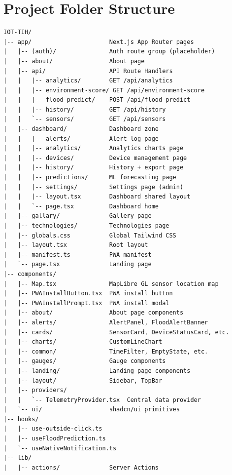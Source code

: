 ﻿%
\chapter{Project Folder Structure}
\label{app:structure}

\begin{lstlisting}[language={},caption={Top-level project folder structure}]
IOT-TIH/
|-- app/                      Next.js App Router pages
|   |-- (auth)/               Auth route group (placeholder)
|   |-- about/                About page
|   |-- api/                  API Route Handlers
|   |   |-- analytics/        GET /api/analytics
|   |   |-- environment-score/ GET /api/environment-score
|   |   |-- flood-predict/    POST /api/flood-predict
|   |   |-- history/          GET /api/history
|   |   `-- sensors/          GET /api/sensors
|   |-- dashboard/            Dashboard zone
|   |   |-- alerts/           Alert log page
|   |   |-- analytics/        Analytics charts page
|   |   |-- devices/          Device management page
|   |   |-- history/          History + export page
|   |   |-- predictions/      ML forecasting page
|   |   |-- settings/         Settings page (admin)
|   |   |-- layout.tsx        Dashboard shared layout
|   |   `-- page.tsx          Dashboard home
|   |-- gallary/              Gallery page
|   |-- technologies/         Technologies page
|   |-- globals.css           Global Tailwind CSS
|   |-- layout.tsx            Root layout
|   |-- manifest.ts           PWA manifest
|   `-- page.tsx              Landing page
|-- components/
|   |-- Map.tsx               MapLibre GL sensor location map
|   |-- PWAInstallButton.tsx  PWA install button
|   |-- PWAInstallPrompt.tsx  PWA install modal
|   |-- about/                About page components
|   |-- alerts/               AlertPanel, FloodAlertBanner
|   |-- cards/                SensorCard, DeviceStatusCard, etc.
|   |-- charts/               CustomLineChart
|   |-- common/               TimeFilter, EmptyState, etc.
|   |-- gauges/               Gauge components
|   |-- landing/              Landing page components
|   |-- layout/               Sidebar, TopBar
|   |-- providers/
|   |   `-- TelemetryProvider.tsx  Central data provider
|   `-- ui/                   shadcn/ui primitives
|-- hooks/
|   |-- use-outside-click.ts
|   |-- useFloodPrediction.ts
|   `-- useNativeNotification.ts
|-- lib/
|   |-- actions/              Server Actions

\end{lstlisting}
